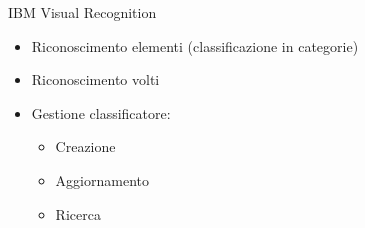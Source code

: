 %
\begin{frame}[t]{IBM Visual Recognition}
\begin{itemize}
	\item Riconoscimento elementi (classificazione in categorie)
	\item Riconoscimento volti
	\item Gestione classificatore:
	\begin{itemize}
		\item Creazione
		\item Aggiornamento
		\item Ricerca
	\end{itemize}
\end{itemize}
\end{frame}
%
